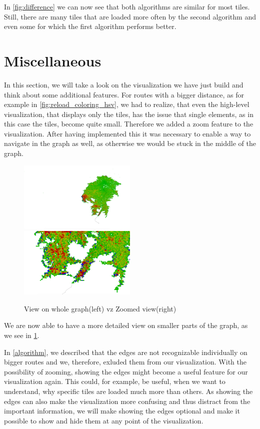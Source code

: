 \documentclass
[
    paper = a4,
    pagesize,
    12 pt,
    oneside,                       %
    open = right,
    DIV = calc,
    BCOR = 0 mm,                   %
    bibtotoc
]
{scrbook}
\begin{document}
In  \cref{fig:difference} we can now see that both algorithms are similar for most tiles.
Still, there are many tiles that are loaded more often by the second algorithm and even some for which the first algorithm performs better.


\section{Miscellaneous}

In this section, we will take a look on the visualization we have just build and think about some additional features.
For routes with a bigger distance, as for example in \cref{fig:reload_coloring_hsv}, we had to realize, that even the high-level visualization, that displays only the tiles, has the issue that single elements, as in this case the tiles, become quite small.
Therefore we added a zoom feature to the visualization.
After having implemented this it was necessary to enable a way to navigate in the graph as well, as otherwise we would be stuck in the middle of the graph.

\begin{figure}[H]
    \includegraphics[width=0.5\textwidth]{Images/vis-zoom-small.png}
    \includegraphics[width=0.5\textwidth]{Images/vis-zoom-large.png}
\caption[]{View on whole graph(left) vz Zoomed view(right)}
\label{fig:zoom}
\end{figure}

We are now able to have a more detailed view on smaller parts of the graph, as we see in \cref{fig:zoom}.

In \cref{algorithm}, we described that the edges are not recognizable individually on bigger routes and we, therefore, exluded them from our visualization.
With the possibility of zooming, showing the edges might become a useful feature for our visualization again.
This could, for example, be useful, when we want to understand, why specific tiles are loaded much more than others.
As showing the edges can also make the visualization more confusing and thus distract from the important information, we will make showing the edges optional and make it possible to show and hide them at any point of the visualization.
\end{document}
